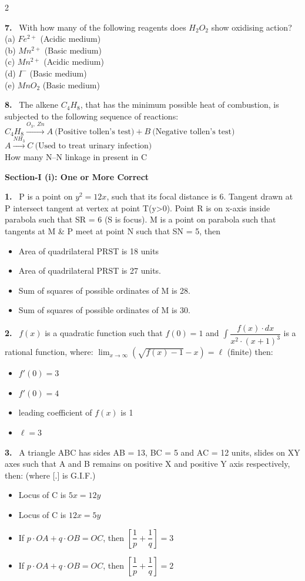 \documentclass[10pt]{extarticle}
\newcommand{\partsec}[2]{\par\medskip\noindent{\large\bfseries PART-#1: #2}\par\smallskip}
\newcommand{\sect}[1]{\par\smallskip\noindent\textbf{#1}\par}
\newcommand{\qn}[1]{\par\smallskip\noindent\textbf{#1.}~}
\newenvironment{qoptions}{\begin{itemize}[leftmargin=1.8em,itemsep=1pt,topsep=2pt,label={}]}{\end{itemize}}
\newcommand{\opt}[2]{\item[(#1)] #2}
\begin{document}
\begin{multicols}{2}
\qn{7} With how many of the following reagents does $H_2O_2$ show oxidising action?\\
(a) $Fe^{2+}$ (Acidic medium)\\
(b) $Mn^{2+}$ (Basic medium)\\
(c) $Mn^{2+}$ (Acidic medium)\\
(d) $I^-$ (Basic medium)\\
(e) $MnO_2$ (Basic medium)

\qn{8} The alkene $C_4H_8$, that has the minimum possible heat of combustion, is subjected to the following sequence of reactions:\\
$C_4H_8\xrightarrow{O_3,\ Zn}A\ \text{(Positive tollen's test)}+B\ \text{(Negative tollen's test)}$\\
$A\xrightarrow{NH_3}C\ \text{(Used to treat urinary infection)}$\\
How many N--N linkage in present in C

\partsec{3}{MATHEMATICS}
\sect{Section-I (i): One or More Correct}

\qn{1} P is a point on $y^2=12x$, such that its focal distance is 6. Tangent drawn at P intersect tangent at vertex at point T(y>0). Point R is on x-axis inside parabola such that SR = 6 (S is focus). M is a point on parabola such that tangents at M \& P meet at point N such that SN = 5, then
\begin{qoptions}
\opt{A}{Area of quadrilateral PRST is 18 units}
\opt{B}{Area of quadrilateral PRST is 27 units.}
\opt{C}{Sum of squares of possible ordinates of M is 28.}
\opt{D}{Sum of squares of possible ordinates of M is 30.}
\end{qoptions}

\qn{2} $f(x)$ is a quadratic function such that $f(0)=1$ and $\displaystyle\int\dfrac{f(x)\cdot dx}{x^2\cdot(x+1)^3}$ is a rational function, where: $\displaystyle\lim_{x\to\infty}\left(\sqrt{f(x)-1}-x\right)=\ell$ (finite) then:
\begin{qoptions}
\opt{A}{$f'(0)=3$}
\opt{B}{$f'(0)=4$}
\opt{C}{leading coefficient of $f(x)$ is 1}
\opt{D}{$\ell=3$}
\end{qoptions}

\qn{3} A triangle ABC has sides AB = 13, BC = 5 and AC = 12 units, slides on XY axes such that A and B remains on positive X and positive Y axis respectively, then: (where [.] is G.I.F.)
\begin{qoptions}
\opt{A}{Locus of C is $5x=12y$}
\opt{B}{Locus of C is $12x=5y$}
\opt{C}{If $p\cdot OA+q\cdot OB=OC$, then $\left[\dfrac1p+\dfrac1q\right]=3$}
\opt{D}{If $p\cdot OA+q\cdot OB=OC$, then $\left[\dfrac1p+\dfrac1q\right]=2$}
\end{qoptions}


\end{multicols}
\end{document}
